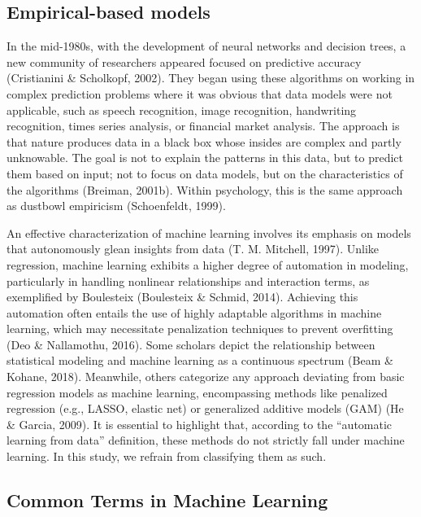 \documentclass[
  man]{apa7}
\begin{document}
\hypertarget{empirical-based-models}{%
\subsection{Empirical-based models}\label{empirical-based-models}}

In the mid-1980s, with the development of neural networks and decision trees, a new community of researchers appeared focused on predictive accuracy (Cristianini \& Scholkopf, 2002).
They began using these algorithms on working in complex prediction problems where it was obvious that data models were not applicable, such as speech recognition, image recognition, handwriting recognition, times series analysis, or financial market analysis.
The approach is that nature produces data in a black box whose insides are complex and partly unknowable.
The goal is not to explain the patterns in this data, but to predict them based on input; not to focus on data models, but on the characteristics of the algorithms (Breiman, 2001b).
Within psychology, this is the same approach as dustbowl empiricism (Schoenfeldt, 1999).

An effective characterization of machine learning involves its emphasis on models that autonomously glean insights from data (T. M. Mitchell, 1997).
Unlike regression, machine learning exhibits a higher degree of automation in modeling, particularly in handling nonlinear relationships and interaction terms, as exemplified by Boulesteix (Boulesteix \& Schmid, 2014).
Achieving this automation often entails the use of highly adaptable algorithms in machine learning, which may necessitate penalization techniques to prevent overfitting (Deo \& Nallamothu, 2016).
Some scholars depict the relationship between statistical modeling and machine learning as a continuous spectrum (Beam \& Kohane, 2018).
Meanwhile, others categorize any approach deviating from basic regression models as machine learning, encompassing methods like penalized regression (e.g., LASSO, elastic net) or generalized additive models (GAM) (He \& Garcia, 2009).
It is essential to highlight that, according to the ``automatic learning from data'' definition, these methods do not strictly fall under machine learning.
In this study, we refrain from classifying them as such.

\hypertarget{common-terms-in-machine-learning}{%
\subsection{Common Terms in Machine Learning}\label{common-terms-in-machine-learning}}
\end{document}
